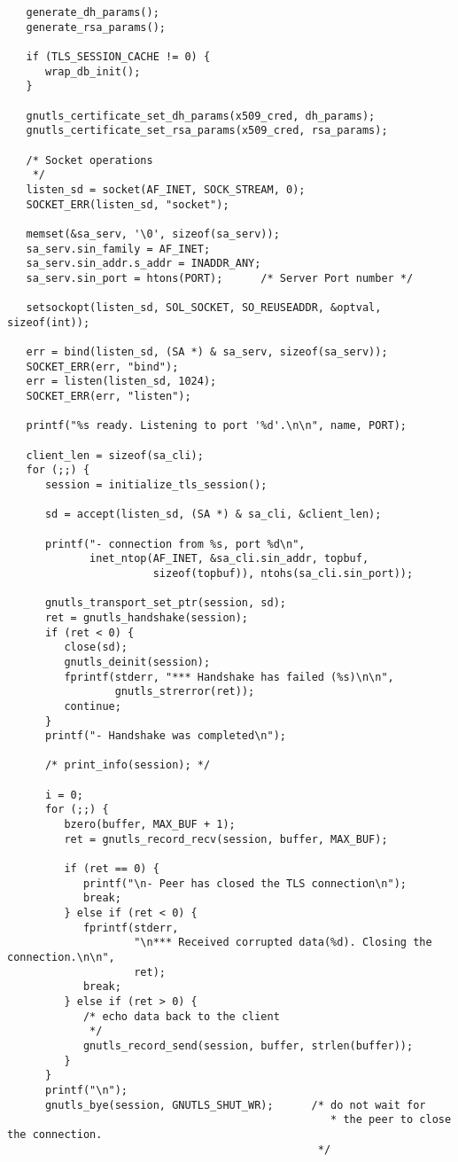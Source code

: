 \begin{verbatim}
   generate_dh_params();
   generate_rsa_params();

   if (TLS_SESSION_CACHE != 0) {
      wrap_db_init();
   }

   gnutls_certificate_set_dh_params(x509_cred, dh_params);
   gnutls_certificate_set_rsa_params(x509_cred, rsa_params);

   /* Socket operations
    */
   listen_sd = socket(AF_INET, SOCK_STREAM, 0);
   SOCKET_ERR(listen_sd, "socket");

   memset(&sa_serv, '\0', sizeof(sa_serv));
   sa_serv.sin_family = AF_INET;
   sa_serv.sin_addr.s_addr = INADDR_ANY;
   sa_serv.sin_port = htons(PORT);      /* Server Port number */

   setsockopt(listen_sd, SOL_SOCKET, SO_REUSEADDR, &optval, sizeof(int));

   err = bind(listen_sd, (SA *) & sa_serv, sizeof(sa_serv));
   SOCKET_ERR(err, "bind");
   err = listen(listen_sd, 1024);
   SOCKET_ERR(err, "listen");

   printf("%s ready. Listening to port '%d'.\n\n", name, PORT);

   client_len = sizeof(sa_cli);
   for (;;) {
      session = initialize_tls_session();

      sd = accept(listen_sd, (SA *) & sa_cli, &client_len);

      printf("- connection from %s, port %d\n",
             inet_ntop(AF_INET, &sa_cli.sin_addr, topbuf,
                       sizeof(topbuf)), ntohs(sa_cli.sin_port));

      gnutls_transport_set_ptr(session, sd);
      ret = gnutls_handshake(session);
      if (ret < 0) {
         close(sd);
         gnutls_deinit(session);
         fprintf(stderr, "*** Handshake has failed (%s)\n\n",
                 gnutls_strerror(ret));
         continue;
      }
      printf("- Handshake was completed\n");

      /* print_info(session); */

      i = 0;
      for (;;) {
         bzero(buffer, MAX_BUF + 1);
         ret = gnutls_record_recv(session, buffer, MAX_BUF);

         if (ret == 0) {
            printf("\n- Peer has closed the TLS connection\n");
            break;
         } else if (ret < 0) {
            fprintf(stderr,
                    "\n*** Received corrupted data(%d). Closing the connection.\n\n",
                    ret);
            break;
         } else if (ret > 0) {
            /* echo data back to the client
             */
            gnutls_record_send(session, buffer, strlen(buffer));
         }
      }
      printf("\n");
      gnutls_bye(session, GNUTLS_SHUT_WR);      /* do not wait for
                                                   * the peer to close the connection.
                                                 */


\end{verbatim}
